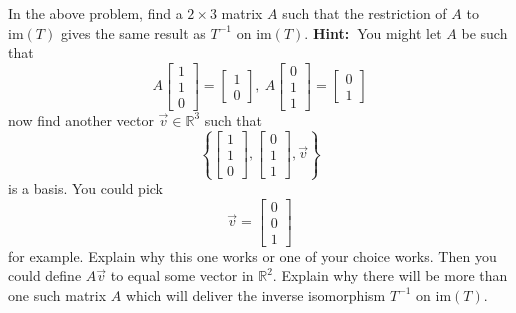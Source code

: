 \documentclass{ximera}
\begin{document}
\begin{problem}\label{prb:10.84} In the above problem, find a $2\times 3$ matrix $A$ such that the
restriction of $A$ to $\mbox{im}\left( T\right) $ gives the same result as $
T^{-1}$ on $\mbox{im}\left( T\right) $. \textbf{Hint:\ }You might let $A$ be
such that
\begin{equation*}
A\left[
\begin{array}{c}
1 \\
1 \\
0
\end{array}
\right] =\left[
\begin{array}{c}
1 \\
0
\end{array}
\right] ,\ A\left[
\begin{array}{c}
0 \\
1 \\
1
\end{array}
\right] =\left[
\begin{array}{c}
0 \\
1
\end{array}
\right]
\end{equation*}
now find another vector $\vec{v}\in \mathbb{R}^{3}$ such that
\begin{equation*}
\left\{ \left[
\begin{array}{c}
1 \\
1 \\
0
\end{array}
\right] ,\left[
\begin{array}{c}
0 \\
1 \\
1
\end{array}
\right] ,\vec{v}\right\}
\end{equation*}
is a basis. You could pick
\begin{equation*}
\vec{v}=\left[
\begin{array}{c}
0 \\
0 \\
1
\end{array}
\right]
\end{equation*}
for example. Explain why this one works or one of your choice works. Then
you could define $A\vec{v}$ to equal some vector in $\mathbb{R}^{2}.$
Explain why there will be more than one such matrix $A$ which will deliver
the inverse isomorphism $T^{-1}$ on $\mbox{im}\left( T\right) $.
\end{problem}
\end{document}
